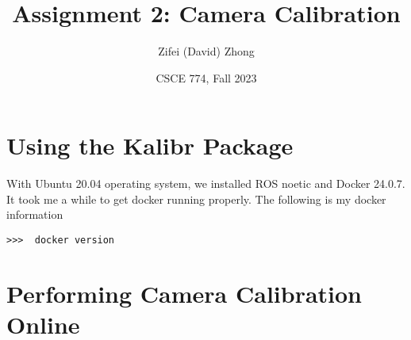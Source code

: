 \documentclass[11pt, oneside]{article}   	%
\title{Assignment 2: Camera Calibration}
\author{Zifei (David) Zhong}
\date{CSCE 774, Fall 2023}							%
\begin{document}
\maketitle

\section{Using the Kalibr Package}
With Ubuntu 20.04 operating system, we installed ROS noetic and Docker 24.0.7. It took me a while to get docker running properly. The following is my docker information
\begin{verbatim}
>>>  docker version
\end{verbatim}

\section{Performing Camera Calibration Online}
\end{document}
